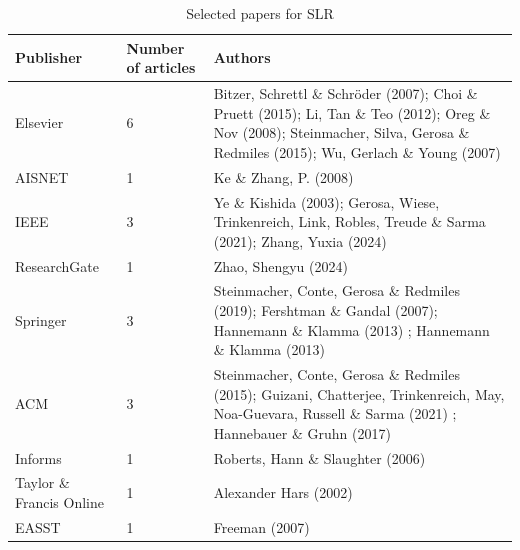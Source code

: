 \begin{table}[ht]
    \begin{tabular}{| m{7em} | m{5em}| m{18em} | }
        \hline
        Publisher                & Number of articles & Authors                                                                                                                                                                           \\ \hline
        Elsevier                 & 6                  & Bitzer, Schrettl \& Schröder (2007); Choi \& Pruett (2015); Li, Tan \& Teo (2012); Oreg \& Nov (2008); Steinmacher, Silva, Gerosa \& Redmiles (2015); Wu, Gerlach \& Young (2007) \\ \hline
        AISNET                   & 1                  & Ke \& Zhang, P. (2008)                                                                                                                                                            \\ \hline
        IEEE                     & 3                  & Ye \& Kishida (2003); Gerosa, Wiese, Trinkenreich, Link, Robles, Treude \& Sarma (2021); Zhang, Yuxia (2024)                                                                      \\ \hline
        ResearchGate             & 1                  & Zhao, Shengyu (2024)                                                                                                                                                              \\ \hline
        Springer                 & 3                  & Steinmacher, Conte, Gerosa \& Redmiles (2019); Fershtman \& Gandal  (2007); Hannemann \& Klamma (2013) ; Hannemann \& Klamma (2013)                                               \\ \hline
        ACM                      & 3                  & Steinmacher, Conte, Gerosa \& Redmiles (2015); Guizani, Chatterjee, Trinkenreich, May, Noa-Guevara, Russell \& Sarma (2021) ; Hannebauer \& Gruhn (2017)                          \\ \hline
        Informs                  & 1                  & Roberts, Hann \& Slaughter (2006)                                                                                                                                                 \\ \hline
        Taylor \& Francis Online & 1                  & Alexander Hars (2002)                                                                                                                                                             \\ \hline
        EASST                    & 1                  & Freeman (2007)                                                                                                                                                                    \\ \hline
    \end{tabular}
    \caption{Selected papers for SLR}
    \label{tab:databasePapers}
\end{table}


